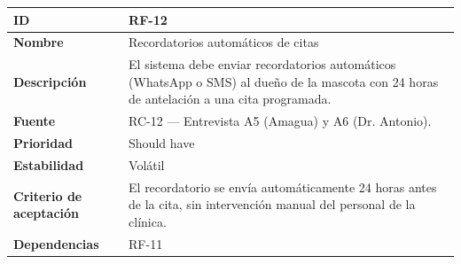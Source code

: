 {\def\LTcaptype{none} %
\begin{longtable}[]{@{}
  >{\raggedright\arraybackslash}p{}
  >{\raggedright\arraybackslash}p{}@{}}
\toprule\noalign{}
\begin{minipage}[b]{\linewidth}\raggedright
\textbf{ID}
\end{minipage} & \begin{minipage}[b]{\linewidth}\raggedright
RF-12
\end{minipage} \\
\midrule\noalign{}
\endhead
\bottomrule\noalign{}
\endlastfoot
\textbf{Nombre} & \begin{minipage}[t]{\linewidth}\raggedright
Recordatorios automáticos de citas
\end{minipage} \\
\textbf{Descripción} & \begin{minipage}[t]{\linewidth}\raggedright
El sistema debe enviar recordatorios automáticos (WhatsApp o SMS) al
dueño de la mascota con 24 horas de antelación a una cita programada.
\end{minipage} \\
\textbf{Fuente} & \begin{minipage}[t]{\linewidth}\raggedright
RC-12 --- Entrevista A5 (Amagua) y A6 (Dr. Antonio).
\end{minipage} \\
\textbf{Prioridad} & \begin{minipage}[t]{\linewidth}\raggedright
Should have
\end{minipage} \\
\textbf{Estabilidad} & \begin{minipage}[t]{\linewidth}\raggedright
Volátil
\end{minipage} \\
\textbf{Criterio de aceptación} &
\begin{minipage}[t]{\linewidth}\raggedright
El recordatorio se envía automáticamente 24 horas antes de la cita, sin
intervención manual del personal de la clínica.
\end{minipage} \\
\textbf{Dependencias} & \begin{minipage}[t]{\linewidth}\raggedright
RF-11
\end{minipage} \\
\end{longtable}
}

